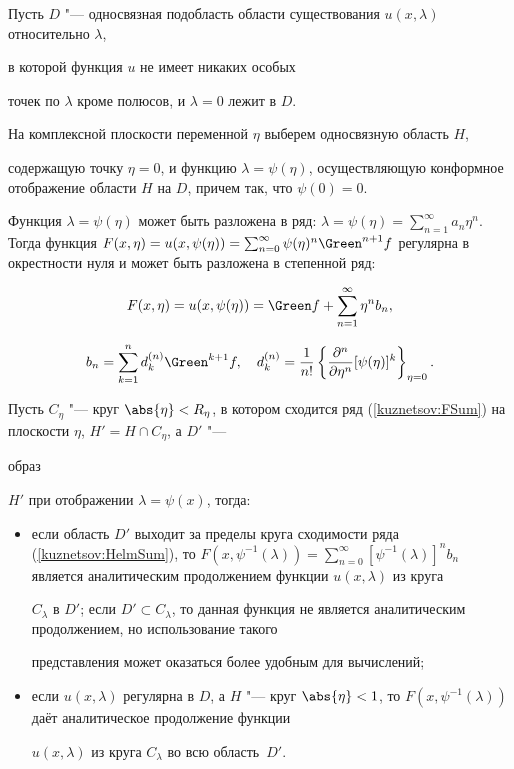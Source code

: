     Пусть $D$ "--- односвязная подобласть области существования $u(x,  \lambda)$ относительно $\lambda$,

в которой функция $u$ не имеет никаких особых

точек по $\lambda$ кроме полюсов,  и $\lambda=0$ лежит в $D$.

На комплексной плоскости переменной $\eta$ выберем односвязную область $H$,

содержащую точку $\eta=0$,  и функцию $\lambda=\psi(\eta)$,  осуществляющую конформное отображение области $H$ на $D$,  причем так,  что $\psi(0)=0$.

Функция $\lambda=\psi(\eta)$ может быть разложена в ряд: $\lambda=\psi(\eta)=\sum_{n=1}^\infty a_n\eta^n$. Тогда функция $F(x,  \eta)=u(x,

\psi(\eta))=\sum_{n=0}^\infty\psi(\eta)^n\Green^{n+1}f$ регулярна в окрестности нуля и может быть разложена в степенной ряд:

\begin{equation}

            F(x,  \eta)=u(x,  \psi(\eta))=\Green f+ \sum_{n=1}^\infty\eta^n b_n, \label{kuznetsov:FSum}

\end{equation}

$$

        b_n=\sum_{k=1}^nd_{k}^{(n)}\Green^{k+1}f, \quad

        d_{k}^{(n)}=\frac{1}{n!}\left\{\frac{\partial^n}{\partial\eta^n}[\psi(\eta)]^k\right\}_{\eta=0}.

    $$



Пусть $C_\eta$ "--- круг $\abs{\eta}<R_\eta$,  в котором сходится ряд (\ref{kuznetsov:FSum}) на плоскости $\eta$,  $H'={H\cap C_\eta}$,  а $D'$ "---

образ

$H'$ при отображении $\lambda=\psi(x)$,  тогда:

\begin{itemize}

    \item если область $D'$ выходит за пределы круга сходимости ряда (\ref{kuznetsov:HelmSum}),  то $F(x, \psi^{-1}(\lambda))=\sum_{n=0}^\infty[\psi^{-1}(\lambda)]^n b_n$ является аналитическим продолжением функции $u(x,  \lambda)$ из круга

$C_\lambda$ в $D'$; если $D'\subset C_\lambda$,  то данная функция не является аналитическим продолжением,  но использование такого

представления может оказаться более удобным для вычислений;

    \item если $u(x,  \lambda)$ регулярна в $D$,  а $H$ "--- круг $\abs{\eta}<1$,  то $F(x,  \psi^{-1}(\lambda))$ даёт аналитическое продолжение функции

$u(x,  \lambda)$ из круга $C_\lambda$ во всю область~$D'$.

\end{itemize}



